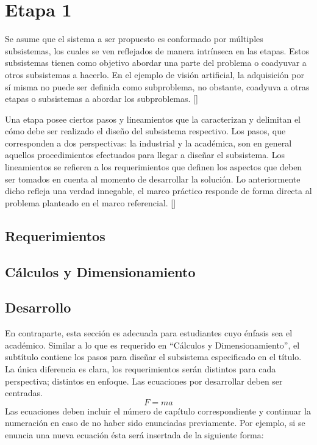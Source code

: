 \section{Etapa 1}
Se asume que el sistema a ser propuesto es conformado por múltiples subsistemas, los cuales se ven reflejados de manera intrínseca en las etapas. Estos subsistemas tienen como objetivo abordar una parte del problema o coadyuvar a otros subsistemas a hacerlo. En el ejemplo de visión artificial, la adquisición por sí misma no puede ser definida como subproblema, no obstante, coadyuva a otras etapas o subsistemas a abordar los subproblemas. [\cite{borgman2003from}] 

Una etapa posee ciertos pasos y lineamientos que la caracterizan y delimitan el cómo debe ser realizado el diseño del subsistema respectivo. Los pasos, que corresponden a dos perspectivas: la industrial y la académica, son en general aquellos procedimientos efectuados para llegar a diseñar el subsistema. Los lineamientos se refieren a los requerimientos que definen los aspectos que deben ser tomados en cuenta al momento de desarrollar la solución. Lo anteriormente dicho refleja una verdad innegable, el marco práctico responde de forma directa al problema planteado en el marco referencial. [\cite{greenberg1998camel}]

\subsection{Requerimientos}
\subsection{Cálculos y Dimensionamiento}
\subsection{Desarrollo}
En contraparte, esta sección es adecuada para estudiantes cuyo énfasis sea el académico. Similar a lo que es requerido en “Cálculos y Dimensionamiento”, el subtítulo contiene los pasos para diseñar el subsistema especificado en el título. La única diferencia es clara, los requerimientos serán distintos para cada perspectiva; distintos en enfoque.
Las ecuaciones por desarrollar deben ser centradas.
\begin{equation}
	F = ma
\end{equation}
Las ecuaciones deben incluir el número de capítulo correspondiente y continuar la numeración en caso de no haber sido enunciadas previamente. Por ejemplo, si se enuncia una nueva ecuación ésta será insertada de la siguiente forma:

